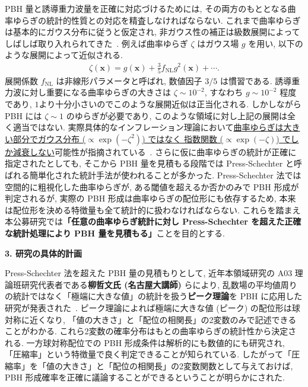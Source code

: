 \documentclass[11pt,a4paper,uplatex,dvipdfmx]{ujarticle} 		%
\newcommand{\研究課題名}{曲率ゆらぎの統計と原始ブラックホール量の精密対応}
\newcommand{\研究機関名}{名古屋大学}
\newcommand{\研究代表者氏名}{多田祐一郎}
\newcommand{\研究期間の最終元号年度}{4}  %
\renewcommand{\emph}[1]{{\sffamily\gtfamily\bfseries #1}}
\newcommand{\fNL}{f_\mathrm{NL}}
\newcommand{\bae}[1]{\begin{align} #1 \end{align}}
\newcommand{\bfx}{\mathbf{x}}
\begin{document}
PBH 量と誘導重力波量を正確に対応づけるためには, その両方のもととなる曲率ゆらぎの統計的性質との対応を精査しなければならない.
これまで曲率ゆらぎは基本的にガウス分布に従うと仮定され, 非ガウス性の補正は級数展開によってしばしば取り入れられてきた~\cite{Byrnes:2012yx}.
例えば曲率ゆらぎ $\zeta$ はガウス場 $g$ を用い, 以下のような展開によって近似される.
\bae{\label{eq: fNL expansion}
	\zeta(\bfx)=g(\bfx)+\frac{3}{5}\fNL g^2(\bfx)+\cdots.
}
展開係数 $\fNL$ は非線形パラメータと呼ばれ, 数値因子 $3/5$ は慣習である.
誘導重力波に対し重要になる曲率ゆらぎの大きさは $\zeta\sim10^{-2}$, すなわち $g\sim10^{-2}$ 程度であり, $1$より十分小さいのでこのような展開近似は正当化される.
しかしながら PBH には $\zeta\sim1$ のゆらぎが必要であり, このような領域に対し上記の展開は全く適当ではない.
実際具体的なインフレーション理論において\ul{曲率ゆらぎは大きい部分でガウス分布 ({$\propto\exp(-\zeta^2)$}) ではなく
指数関数 ({$\propto\exp(-\zeta)$}) でしか減衰しない}可能性が指摘されている~\cite{Ezquiaga:2019ftu}.
さらに仮に曲率ゆらぎの統計が正確に指定されたとしても, そこから PBH 量を見積もる段階では Press-Schechter と呼ばれる簡単化された統計手法が使われることが多かった.
Press-Schechter 法では空間的に粗視化した曲率ゆらぎが, ある閾値を超えるか否かのみで PBH 形成が判定されるが,
実際の PBH 形成は曲率ゆらぎの配位形にも依存するため, 本来は配位形を決める特徴量も全て統計的に扱わなければならない.
これらを踏まえ本公募研究では\emph{「任意の曲率ゆらぎ統計に対し Press-Schechter を超えた正確な統計処理により PBH 量を見積もる」}ことを目的とする.


\begin{mdframed}[roundcorner=0.5zw,
	innertopmargin=0.8zw,innerbottommargin=0.8zw,
	linecolor=black!50,linewidth=0.2zw,
	backgroundcolor=black!10]
	{\bfseries\gtfamily\sffamily\large 3. 研究の具体的計画}
\end{mdframed}

\noindent
Press-Schechter 法を超えた PBH 量の見積もりとして, 近年本領域研究の A03 理論班研究代表者である\emph{柳哲文氏 (名古屋大講師)} らにより,
乱数場の平均値周りの統計ではなく「極端に大きな値」の統計を扱う\emph{ピーク理論}を PBH に応用した研究が発表された~\cite{Yoo:2018kvb}.
ピーク理論によれば極端に大きな値 (ピーク) の配位形は球対称に近くなり, 「値の大きさ」と「配位の相関長」の2変数のみで記述できることがわかる.
これら2変数の確率分布はもとの曲率ゆらぎの統計性から決定される.
一方球対称配位での PBH 形成条件は解析的にも数値的にも研究され, 「圧縮率」という特徴量で良く判定できることが知られている.
したがって「圧縮率」を「値の大きさ」と「配位の相関長」の2変数関数として与えておけば, 
PBH 形成確率を正確に議論することができるということが明らかにされた.
\end{document}
